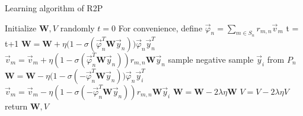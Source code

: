 \documentclass[11pt]{article}
\begin{document}
\begin{algorithm}  
	\caption{Learning algorithm of R2P}  
	\label{alg:r2p}  
	Initialize $\bm{W},V$ randomly\;  
	$t = 0$\;  
	For convenience, define $\vec{\varphi}_n = \sum_{m\in S_n}r_{m,n}\vec{v}_m$\; %
	{  
		t = t+1\;  
		{  
			$\bm{W} = \bm{W}+\eta\big(1-\sigma\left(\vec{\varphi}_n^T\bm{W}\vec{y}_n\right)\big)\vec{\varphi}_n\vec{y}_n^T$\;\label{algline:W}  
			{  
				$\vec{v}_m=\vec{v}_m+ \eta\left(1-\sigma\left(\vec{\varphi}_n^T\bm{W}\vec{y}_n\right)\right)r_{m,n}\bm{W}\vec{y}_n$\;\label{algline:V}  
			}  
			{  
				sample negative sample $\vec{y}_i$ from $P_n$\;  
				$\bm{W} = \bm{W}-\eta\big(1-\sigma\left(-\vec{\varphi}_n^T\bm{W}\vec{y}_n\right)\big)\vec{\varphi}_n\vec{y}_i^T$\;  
				{  
					$\vec{v}_m=\vec{v}_m- \eta\left(1-\sigma\left(-\vec{\varphi}_n^T\bm{W}\vec{y}_n\right)\right)r_{m,n}\bm{W}\vec{y}_i$\;  
				}  
			}  
		}  
		$\bm{W} = \bm{W}-2\lambda\eta\bm{W}$\;  
		$V=V-2\lambda\eta V$  
	}  
	return $\bm{W},V$\;  
\end{algorithm}  

 
\end{document}
